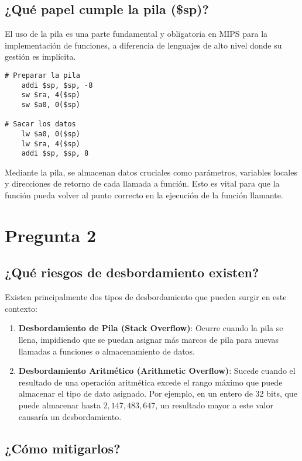 \documentclass{article}
\begin{document}
\subsection*{¿Qué papel cumple la pila (\$sp)?}
El uso de la pila es una parte fundamental y obligatoria en MIPS para la implementación de funciones, a diferencia de lenguajes de alto nivel donde su gestión es implícita.

\begin{lstlisting}[style=Mips32, caption={Uso de la pila en MIPS32}]
# Preparar la pila
	addi $sp, $sp, -8
	sw $ra, 4($sp)
	sw $a0, 0($sp)

# Sacar los datos
	lw $a0, 0($sp)
	lw $ra, 4($sp)
	addi $sp, $sp, 8
\end{lstlisting}
Mediante la pila, se almacenan datos cruciales como parámetros, variables locales y direcciones de retorno de cada llamada a función. Esto es vital para que la función pueda volver al punto correcto en la ejecución de la función llamante.

\section*{Pregunta 2}
\subsection*{¿Qué riesgos de desbordamiento existen?}
Existen principalmente dos tipos de desbordamiento que pueden surgir en este contexto:

\begin{enumerate}
    \item \textbf{Desbordamiento de Pila (Stack Overflow)}: Ocurre cuando la pila se llena, impidiendo que se puedan asignar más marcos de pila para nuevas llamadas a funciones o almacenamiento de datos.
    \item \textbf{Desbordamiento Aritmético (Arithmetic Overflow)}: Sucede cuando el resultado de una operación aritmética excede el rango máximo que puede almacenar el tipo de dato asignado. Por ejemplo, en un entero de 32 bits, que puede almacenar hasta $2,147,483,647$, un resultado mayor a este valor causaría un desbordamiento.
\end{enumerate}

\subsection*{¿Cómo mitigarlos?}
\end{document}
